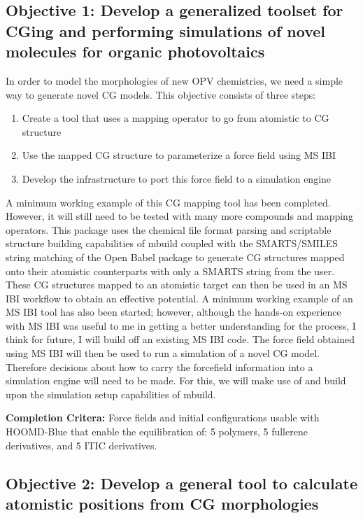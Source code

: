 \subsection*{Objective 1: Develop a generalized toolset for CGing and performing simulations of novel molecules for organic photovoltaics}
In order to model the morphologies of new OPV chemistries, we need a simple way to generate novel CG models.
This objective consists of three steps:
\begin{enumerate}
    \item {Create a tool that uses a mapping operator to go from atomistic to CG structure}
    \item {Use the mapped CG structure to parameterize a force field using MS IBI}
    \item {Develop the infrastructure to port this force field to a simulation engine}
\end{enumerate}
A minimum working example of this CG mapping tool has been completed\cite{grits}.
However, it will still need to be tested with many more compounds and mapping operators.
This package uses the chemical file format parsing and scriptable structure building capabilities of mbuild coupled with the SMARTS/SMILES string matching of the Open Babel package to generate CG structures mapped onto their atomistic counterparts with only a SMARTS string from the user.
These CG structures mapped to an atomistic target can then be used in an MS IBI workflow to obtain an effective potential.
A minimum working example of an MS IBI tool has also been started; however, although the hands-on experience with MS IBI was useful to me in getting a better understanding for the process, I think for future, I will build off an existing MS IBI code\cite{msibi, Moore2014}.
The force field obtained using MS IBI will then be used to run a simulation of a novel CG model.
Therefore decisions about how to carry the forcefield information into a simulation engine will need to be made.
For this, we will make use of and build upon the simulation setup capabilities of mbuild.

\textbf{Completion Critera:} Force fields and initial configurations usable with HOOMD-Blue that enable the equilibration of: 5 polymers, 5 fullerene derivatives, and 5 ITIC derivatives. 

\subsection*{Objective 2: Develop a general tool to calculate atomistic positions from CG morphologies}

